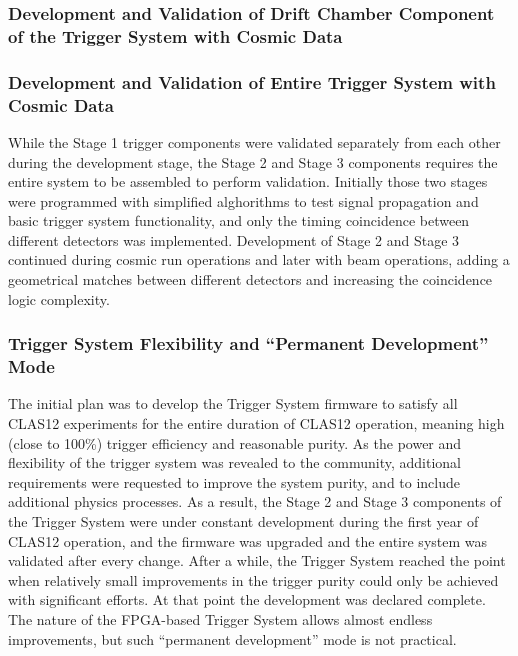 \subsubsection{Development and Validation of Drift Chamber Component of the Trigger System with Cosmic Data}



\subsubsection{Development and Validation of Entire Trigger System with Cosmic Data} 

While the Stage 1 trigger components were validated separately from each other during the development stage, the Stage 2 and Stage 3 components requires the entire system to be assembled to perform validation. Initially those two stages were programmed with simplified alghorithms to test signal propagation and basic trigger system functionality, and only the timing coincidence between different detectors was implemented. Development of Stage 2 and Stage 3 continued during cosmic run operations and later with beam operations, adding a geometrical matches between different detectors and increasing the coincidence logic complexity.


\subsubsection{Trigger System Flexibility and ``Permanent Development'' Mode}

The initial plan was to develop the Trigger System firmware to satisfy all CLAS12 experiments for the entire duration of CLAS12 operation, meaning high (close to 100\%) trigger efficiency and reasonable purity. As the power and flexibility of the trigger system was revealed to the community, additional requirements were requested to improve the system purity, and to include additional physics processes. As a result, the Stage 2 and Stage 3 components of the Trigger System were under constant development during the first year of CLAS12 operation, and the firmware was upgraded and the entire system was validated after every change. After a while, the Trigger System reached the point when relatively small improvements in the trigger purity could only be achieved with significant efforts. At that point the development was declared complete. The nature of the FPGA-based Trigger System allows almost endless improvements, but such ``permanent development'' mode is not practical.
